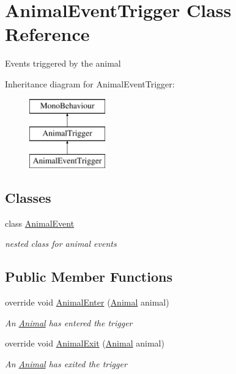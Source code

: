 \hypertarget{class_animal_event_trigger}{}\section{Animal\+Event\+Trigger Class Reference}
\label{class_animal_event_trigger}


Events triggered by the animal  


Inheritance diagram for Animal\+Event\+Trigger\+:\begin{figure}[H]
\begin{center}
\leavevmode
\includegraphics[height=3.000000cm]{class_animal_event_trigger}
\end{center}
\end{figure}
\subsection*{Classes}
\begin{DoxyCompactItemize}
\item 
class \mbox{\hyperlink{class_animal_event_trigger_1_1_animal_event}{Animal\+Event}}
\begin{DoxyCompactList}\small\item\em nested class for animal events \end{DoxyCompactList}\end{DoxyCompactItemize}
\subsection*{Public Member Functions}
\begin{DoxyCompactItemize}
\item 
override void \mbox{\hyperlink{class_animal_event_trigger_a99229b8cc15441fd184fb92747106d14}{Animal\+Enter}} (\mbox{\hyperlink{class_animal}{Animal}} animal)
\begin{DoxyCompactList}\small\item\em An \mbox{\hyperlink{class_animal}{Animal}} has entered the trigger \end{DoxyCompactList}\item 
override void \mbox{\hyperlink{class_animal_event_trigger_a5fb92b33d31fee51fbf2237fd3aead55}{Animal\+Exit}} (\mbox{\hyperlink{class_animal}{Animal}} animal)
\begin{DoxyCompactList}\small\item\em An \mbox{\hyperlink{class_animal}{Animal}} has exited the trigger \end{DoxyCompactList}\end{DoxyCompactItemize}
